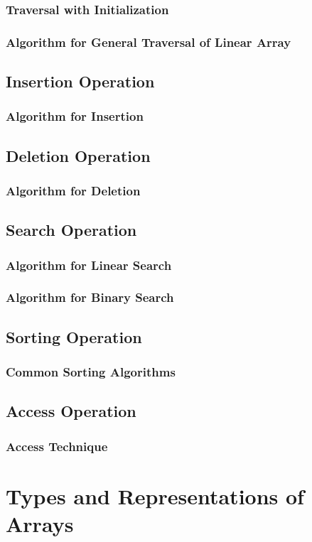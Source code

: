\documentclass[12pt, oneside]{book}
\begin{document}
	\subsection{Traversal with Initialization}
	\subsection{Algorithm for General Traversal of Linear Array}
	\section{Insertion Operation}
	\subsection*{Algorithm for Insertion}
	\section{Deletion Operation}
	\subsection*{Algorithm for Deletion}
	\section{Search Operation}
	\subsection*{Algorithm for Linear Search}
	\subsection*{Algorithm for Binary Search}
	\section{Sorting Operation}
	\subsection*{Common Sorting Algorithms}
	\section{Access Operation}
	\subsection*{Access Technique}
	\chapter{Types and Representations of Arrays}
\end{document}
